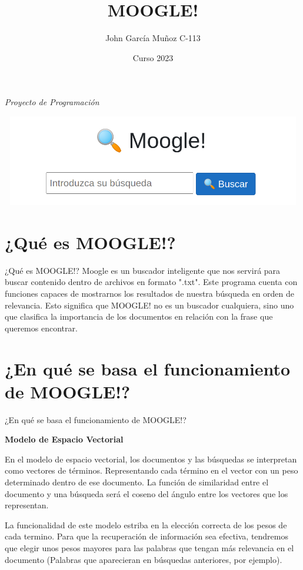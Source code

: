 \documentclass[aspectratio = 169]{beamer}
\title{\Huge MOOGLE!}
\author{John García Muñoz C-113}
\institute{Universidad de La Habana\\Facultad de Matemática y Computación}
\date{Curso 2023}
\begin{document}
\maketitle
\begin{center}
\vfill
\vspace{2cm}
{\itshape\LARGE Proyecto de Programación \par}
\includegraphics[width=14cm, height=4cm]{moogle.png}
\end{center}

\section{¿Qué es MOOGLE!?}
\begin{frame}{¿Qué es MOOGLE!?}
\justifying
Moogle es un buscador inteligente que nos servirá para buscar contenido dentro de archivos en formato ".txt". Este programa cuenta con funciones capaces de mostrarnos los resultados de nuestra búsqueda en orden de relevancia. Esto significa que MOOGLE! no es un buscador cualquiera, sino uno que clasifica la importancia de los documentos en relación con la frase que queremos encontrar.
\end{frame}
\section{¿En qué se basa el funcionamiento de MOOGLE!?}
\begin{frame}{¿En qué se basa el funcionamiento de MOOGLE!?}
\justifying
\begin{center}\textbf{Modelo de Espacio Vectorial}\end{center}
En el modelo de espacio vectorial, los documentos y las búsquedas se interpretan como vectores de términos. Representando cada término en el vector con un peso determinado dentro de ese documento. La función de similaridad entre el documento y una búsqueda será el coseno del ángulo entre los vectores que los representan.

La funcionalidad de este modelo estriba en la elección correcta de los pesos de cada termino. Para que la recuperación de información sea efectiva, tendremos que elegir unos pesos mayores para las palabras que tengan más relevancia en el documento (Palabras que aparecieran en búsquedas anteriores, por ejemplo).
\end{frame}
\end{document}
